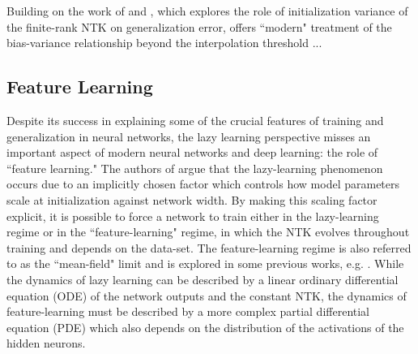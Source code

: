 \documentclass[a4paper, 12pt]{article}
\begin{document}
Building on the work of \cite{meiGeneralizationErrorRandom2019} and \cite{ geigerScalingDescriptionGeneralization2019}, which explores the role of initialization variance of the finite-rank NTK on generalization error, \cite{dascoliDoubleTroubleDouble2020} offers  ``modern" treatment of the bias-variance relationship beyond the interpolation threshold ...

\subsection{Feature Learning}

Despite its success in explaining some of the crucial features of training and generalization in neural networks, the lazy learning perspective misses an important aspect of modern neural networks and deep learning: the role of ``feature learning."  The authors of \cite{chizatLazyTrainingDifferentiable2020} argue that the lazy-learning phenomenon occurs due to an implicitly chosen factor which controls how model parameters scale at initialization against network width. By making this scaling factor explicit, it is possible to force a network to train either in the lazy-learning regime or in the ``feature-learning" regime, in which the NTK evolves throughout training and depends on the data-set. The feature-learning regime is also referred to as the ``mean-field" limit and is explored in some previous works, e.g. \cite{meiMeanFieldView2018}. While the dynamics of lazy learning can be described by a linear ordinary differential equation (ODE) of the network outputs and the constant NTK, the dynamics of feature-learning must be described by a more complex partial differential equation (PDE) which also depends on the distribution of the activations of the hidden neurons.\\
\end{document}
